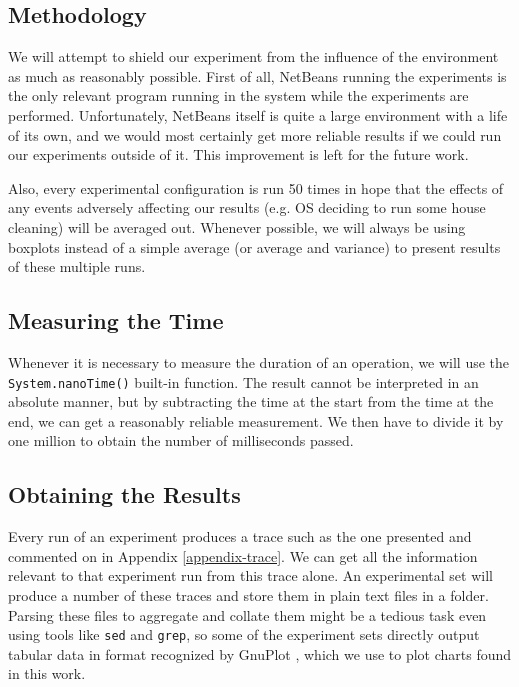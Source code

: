 \subsection{Methodology}

We will attempt to shield our experiment from the influence of the environment as much as reasonably possible. First of all, NetBeans running the experiments is the only relevant program running in the system while the experiments are performed. Unfortunately, NetBeans itself is quite a large environment with a life of its own, and we would most certainly get more reliable results if we could run our experiments outside of it. This improvement is left for the future work.

Also, every experimental configuration is run 50 times in hope that the effects of any events adversely affecting our results (e.g. OS deciding to run some house cleaning) will be averaged out. Whenever possible, we will always be using boxplots instead of a simple average (or average and variance) to present results of these multiple runs.

\subsection{Measuring the Time}

Whenever it is necessary to measure the duration of an operation, we will use the \texttt{System.nanoTime()} built-in function. The result cannot be interpreted in an absolute manner, but by subtracting the time at the start from the time at the end, we can get a reasonably reliable measurement. We then have to divide it by one million to obtain the number of milliseconds passed.

\subsection{Obtaining the Results}

Every run of an experiment produces a trace such as the one presented and commented on in Appendix \ref{appendix-trace}. We can get all the information relevant to that experiment run from this trace alone. An experimental set will produce a number of these traces and store them in plain text files in a folder. Parsing these files to aggregate and collate them might be a tedious task even using tools like \texttt{sed} and \texttt{grep}, so some of the experiment sets directly output tabular data in format recognized by GnuPlot \cite{gnuplot}, which we use to plot charts found in this work.

